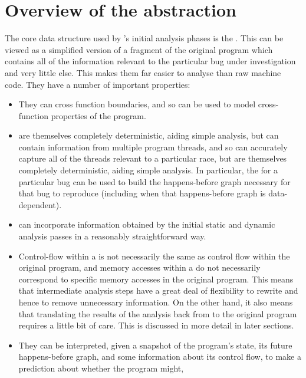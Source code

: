 \section{Overview of the {\StateMachine} abstraction}


The core data structure used by {\technique}'s initial analysis phases
is the {\StateMachine}.  This can be viewed as a simplified version of
a fragment of the original program which contains all of the
information relevant to the particular bug under investigation and
very little else.  This makes them far easier to analyse than raw
machine code.  They have a number of important properties:

\begin{itemize}
\item
  They can cross function boundaries, and so can be used to model
  cross-function properties of the program.
\item
  {\STateMachines} are themselves completely deterministic, aiding
  simple analysis, but can contain information from multiple program
  threads, and so can accurately capture all of the threads relevant
  to a particular race, but are themselves completely deterministic,
  aiding simple analysis.  In particular, the \StateMachine for a
  particular bug can be used to build the happens-before graph
  necessary for that bug to reproduce (including when that
  happens-before graph is data-dependent).
\item
  \STateMachines can incorporate information obtained by the initial
  static and dynamic analysis passes in a reasonably straightforward
  way.
\item
  Control-flow within a \StateMachine is not necessarily the same as
  control flow within the original program, and memory accesses within
  a \StateMachine do not necessarily correspond to specific memory
  accesses in the original program.  This means that intermediate
  analysis steps have a great deal of flexibility to rewrite
  \StateMachines and hence to remove unnecessary information.  On the
  other hand, it also means that translating the results of the
  analysis back from \StateMachines to the original program requires a
  little bit of care.  This is discussed in more detail in later
  sections.
\item
  They can be interpreted, given a snapshot of the program's state,
  its future happens-before graph, and some information about its
  control flow, to make a prediction about whether the program might,

\end{itemize}
